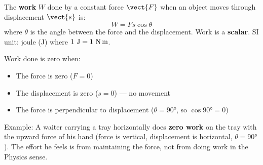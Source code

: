 \begin{definitionbox}
The \textbf{work} $W$ done by a constant force $\vect{F}$
when an object moves through displacement $\vect{s}$ is:
\[
  W = Fs\cos\theta
\]
where $\theta$ is the angle between the force and the
displacement. Work is a \textbf{scalar}. SI unit:
joule (J) where $1\ \text{J} = 1\ \text{N\,m}$.
\end{definitionbox}

\begin{diagbox}
\begin{center}
\end{center}
\end{diagbox}

\begin{keybox}
Work done is zero when:
\begin{itemize}[noitemsep]
  \item The force is zero ($F = 0$)
  \item The displacement is zero ($s = 0$) --- no
  movement
  \item The force is perpendicular to displacement
  ($\theta = 90°$, so $\cos 90° = 0$)
\end{itemize}
Example: A waiter carrying a tray horizontally does
\textbf{zero work} on the tray with the upward
force of his hand (force is vertical, displacement
is horizontal, $\theta = 90°$). The effort he feels
is from maintaining the force, not from doing work
in the Physics sense.
\end{keybox}

